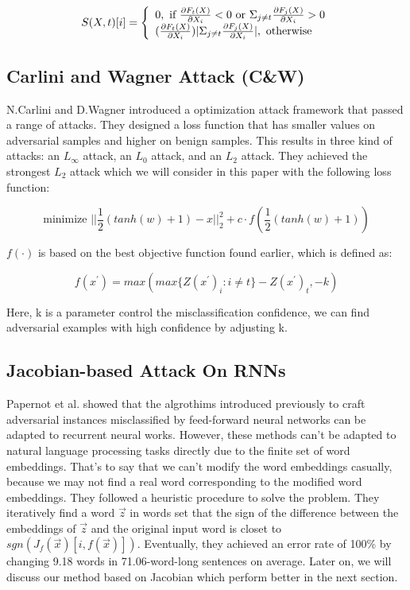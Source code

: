 \documentclass{article}
\begin{document}
\begin{equation}
  S(X,t)[i]=
  \left\{
  \begin{array}{rcl}
    0, \mbox{ if } \frac{\partial F_t(X)}{\partial X_i}<0 \mbox{ or } \Sigma_{j\neq t} \frac{\partial F_j(X)}{\partial X_i}>0 \hfill \\
    (\frac{\partial F_t(X)}{\partial X_i})|\Sigma_{j\neq t} \frac{\partial F_j(X)}{\partial X_i}|, \mbox{ otherwise}          \hfill
  \end{array}
  \right.
  \label{jsma}
\end{equation}

\subsection{Carlini and Wagner Attack (C\&W)}

N.Carlini and D.Wagner introduced a optimization attack framework \cite{carlini2017adversarial} that passed a range of attacks. They designed a loss function that has smaller values on adversarial samples and higher on benign samples. This results in three kind of attacks: an $L_\infty$ attack, an $L_0$ attack, and an $L_2$ attack. They achieved the strongest $L_2$ attack which we will consider in this paper with the following loss function:

\begin{equation}
  \mbox{minimize } ||\frac{1}{2}(tanh(w)+1)-x||_2^2+c\cdot f(\frac{1}{2}(tanh(w)+1))
\end{equation}

$f(\cdot)$ is based on the best objective function found earlier, which is defined as:

\begin{equation}
  f(x^{'})=max(max\{Z(x^{'})_i:i\neq t\}-Z(x^{'})_t,-k)
\end{equation}

Here, k is a parameter control the misclassification confidence, we can find adversarial examples with high confidence by adjusting k.

\subsection{Jacobian-based Attack On RNNs}

Papernot et al. \cite{papernot2016crafting} showed that the algrothims introduced previously to craft adversarial instances misclassified by feed-forward neural networks can be adapted to recurrent neural works. However, these methods can't be adapted to natural language processing tasks directly due to the finite set of word embeddings. That's to say that we can't modify the word embeddings casually, because we may not find a real word corresponding to the modified word embeddings. They followed a heuristic procedure to solve the problem. They iteratively find a word $\vec{z}$ in words set that the sign of the difference between the embeddings of $\vec{z}$ and the original input word is closet to $sgn(J_f(\vec{x})[i,f(\vec{x})])$. Eventually, they achieved an error rate of 100\% by changing 9.18 words in 71.06-word-long sentences on average. Later on, we will discuss our method based on Jacobian which perform better in the next section.
\end{document}
